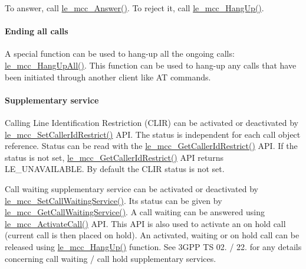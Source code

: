 To answer, call \hyperlink{le__mcc__interface_8h_a598349c6ccfa151dbd1d2f2a9c293ca4}{le\+\_\+mcc\+\_\+\+Answer()}. To reject it, call \hyperlink{le__mcc__interface_8h_a7b9567715a3cd30c83a3b6886eeb2044}{le\+\_\+mcc\+\_\+\+Hang\+Up()}.\hypertarget{c_mcc_le_mcc_ending_all_call}{}\paragraph{Ending all calls}\label{c_mcc_le_mcc_ending_all_call}
A special function can be used to hang-\/up all the ongoing calls\+: \hyperlink{le__mcc__interface_8h_a38ac8543a579ecc81430c121a64bd346}{le\+\_\+mcc\+\_\+\+Hang\+Up\+All()}. This function can be used to hang-\/up any calls that have been initiated through another client like AT commands.\hypertarget{c_mcc_le_mcc_ss}{}\paragraph{Supplementary service}\label{c_mcc_le_mcc_ss}
Calling Line Identification Restriction (C\+L\+IR) can be activated or deactivated by \hyperlink{le__mcc__interface_8h_a6b7fda9b1d0f0208a99b4bdcafe97538}{le\+\_\+mcc\+\_\+\+Set\+Caller\+Id\+Restrict()} A\+PI. The status is independent for each call object reference. Status can be read with the \hyperlink{le__mcc__interface_8h_a54093f7d51cae9a186a97aa799ac3ddc}{le\+\_\+mcc\+\_\+\+Get\+Caller\+Id\+Restrict()} A\+PI. If the status is not set, \hyperlink{le__mcc__interface_8h_a54093f7d51cae9a186a97aa799ac3ddc}{le\+\_\+mcc\+\_\+\+Get\+Caller\+Id\+Restrict()} A\+PI returns L\+E\+\_\+\+U\+N\+A\+V\+A\+I\+L\+A\+B\+LE. By default the C\+L\+IR status is not set.

Call waiting supplementary service can be activated or deactivated by \hyperlink{le__mcc__interface_8h_ac637e687387a5b8cf9c5b02cbb7816fa}{le\+\_\+mcc\+\_\+\+Set\+Call\+Waiting\+Service()}. Its status can be given by \hyperlink{le__mcc__interface_8h_acdf73f5a2e498ee201d8a11c416de29b}{le\+\_\+mcc\+\_\+\+Get\+Call\+Waiting\+Service()}. A call waiting can be answered using \hyperlink{le__mcc__interface_8h_a62626d9db0d9bf56fb2660d9acfdfcc5}{le\+\_\+mcc\+\_\+\+Activate\+Call()} A\+PI. This A\+PI is also used to activate an on hold call (current call is then placed on hold). An activated, waiting or on hold call can be released using \hyperlink{le__mcc__interface_8h_a7b9567715a3cd30c83a3b6886eeb2044}{le\+\_\+mcc\+\_\+\+Hang\+Up()} function. See 3\+G\+PP TS 02. / 22. for any details concerning call waiting / call hold supplementary services.

